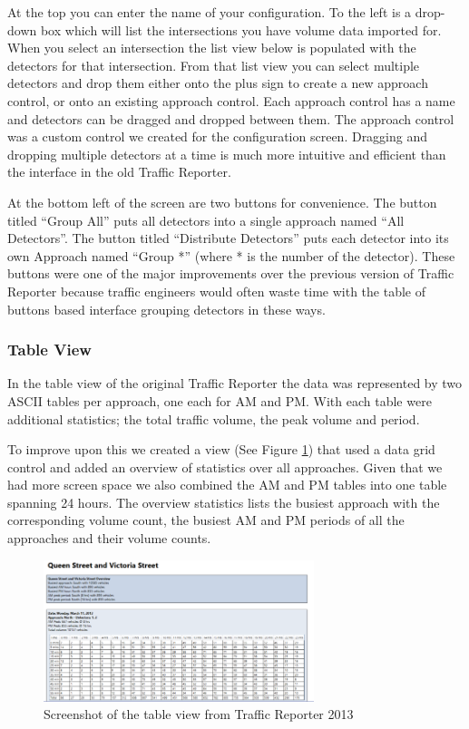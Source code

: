 \documentclass{article}
\begin{document}
At the top you can enter the name of your configuration. To the left is a drop-down box which will list the intersections you have volume data imported for. When you select an intersection the list view below is populated with the detectors for that intersection. From that list view you can select multiple detectors and drop them either onto the plus sign to create a new approach control, or onto an existing approach control. Each approach control has a name and detectors can be dragged and dropped between them. The approach control was a custom control we created for the configuration screen. Dragging and dropping multiple detectors at a time is much more intuitive and efficient than the interface in the old Traffic Reporter.

At the bottom left of the screen are two buttons for convenience. The button titled ``Group All'' puts all detectors into a single approach named ``All Detectors''. The button titled ``Distribute Detectors'' puts each detector into its own Approach named ``Group *'' (where * is the number of the detector). These buttons were one of the major improvements over the previous version of Traffic Reporter because traffic engineers would often waste time with the table of buttons based interface grouping detectors in these ways.

\subsubsection{Table View}
In the table view of the original Traffic Reporter the data was represented by two ASCII tables per approach, one each for AM and PM. With each table were additional statistics; the total traffic volume, the peak volume and period. 

To improve upon this we created a view (See Figure \ref{fig:newTable}) that used a data grid control and added an overview of statistics over all approaches. Given that we had more screen space we also combined the AM and PM tables into one table spanning 24 hours.
The overview statistics lists the busiest approach with the corresponding volume count, the busiest AM and PM periods of all the approaches and their volume counts.

\begin{figure}[!t]
\centerline{\includegraphics[width=3.1in]{newTable}}
\caption{Screenshot of the table view from Traffic Reporter 2013}
\label{fig:newTable}
\end{figure}
\end{document}
